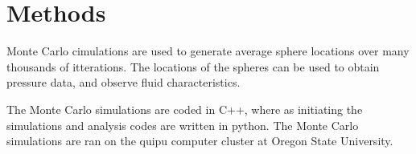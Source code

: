 \documentclass[a4paper,12pt]{article}
\begin{document}
\section*{Methods}

Monte Carlo cimulations are used to generate average sphere locations over many thousands of itterations.  The locations of the spheres can be used to obtain pressure data, and observe fluid characteristics.

The Monte Carlo simulations are coded in C++, where as initiating the simulations and analysis codes are written in python.  The Monte Carlo simulations are ran on the quipu computer cluster at Oregon State University.
\end{document}
